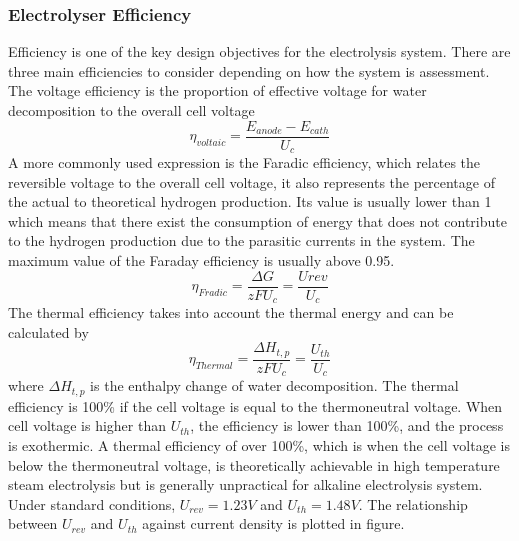\subsubsection{Electrolyser Efficiency }  
Efficiency is one of the key design objectives for the electrolysis system. There are three main efficiencies to consider depending on how the system is assessment. The voltage efficiency is the proportion of effective voltage for water decomposition to the overall cell voltage
\begin{equation}
\eta_{voltaic} = \frac{E_{anode} - E_{cath} }{U_c}
\end{equation}
A more commonly used expression is the Faradic efficiency, which relates the reversible voltage to the overall cell voltage, it also represents the percentage of the actual to theoretical hydrogen production. Its value is usually lower than 1 which means that there exist the consumption of energy that does not contribute to the hydrogen production due to the parasitic currents in the system. The maximum value of the Faraday efficiency is usually above 0.95.
\begin{equation}
\eta_{Fradic} = \frac{\Delta G}{zFU_c} = \frac{U{rev}}{U_c} 
\end{equation}
The thermal efficiency takes into account the thermal energy and can be calculated by
\begin{equation}
\eta_{Thermal} = \frac{\Delta H_{t,p}}{zFU_c} = \frac{U_{th}}{U_c} 
\end{equation} 
where $\Delta H_{t,p}$ is the enthalpy change of water decomposition. The thermal efficiency is 100\% if the cell voltage is equal to the thermoneutral voltage. When cell voltage is higher than $U_{th}$, the efficiency is lower than 100\%, and the process is exothermic. A thermal efficiency of over 100\%, which is when the cell voltage is below the thermoneutral voltage,  is theoretically achievable in high temperature steam electrolysis but is generally unpractical for alkaline electrolysis system. Under standard conditions, $U_{rev} = 1.23V$ and $U_{th} = 1.48V$. The relationship between $U_{rev}$ and $U_{th}$ against current density is plotted in figure.
